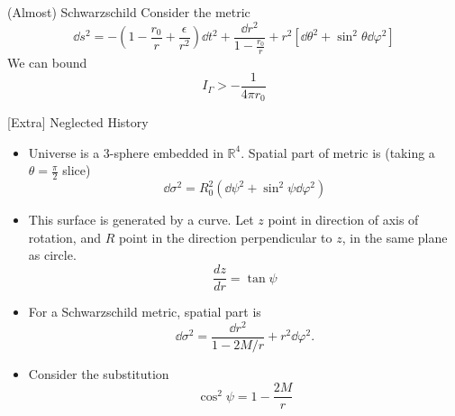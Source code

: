 \documentclass[aspectratio=169,xcolor=dvipsnames]{beamer}
\begin{document}
\begin{frame}{(Almost) Schwarzschild}
    Consider the metric 
    \begin{equation}
        \dd{s}^2 = -\left(1-\frac{r_0}{r} + \frac{\epsilon}{r^2}\right)\dd{t}^2 + \frac{\dd{r}^2}{1-\frac{r_0}{r}} + r^2\left[\dd{\theta}^2 + \sin^2\theta \dd{\varphi}^2\right]
    \end{equation}
    We can bound 
    \begin{equation}
        I_{\Gamma} > -\frac{1}{4\pi r_0}
    \end{equation}
\end{frame}
\begin{frame}{[Extra] Neglected History}
    \begin{itemize}
        \item Universe is a 3-sphere embedded in $\mathbb{R}^4.$ Spatial part of metric is (taking a $\theta=\frac{\pi}{2}$ slice)
        \begin{equation}
            \dd{\sigma}^2 = R_0^2\left(\dd{\psi}^2 + \sin^2\psi\dd{\varphi}^2\right)
        \end{equation}
        \item This surface is generated by a curve. Let $z$ point in direction of axis of rotation, and $R$ point in the direction perpendicular to $z$, in the same plane as circle.
        \begin{equation}
            \frac{dz}{dr} = \tan\psi
        \end{equation}
        \item For a Schwarzschild metric, spatial part is 
        \begin{equation}
            \dd{\sigma}^2 = \frac{\dd{r}^2}{1-2M/r} + r^2\dd{\varphi}^2.
        \end{equation}
        \item Consider the substitution 
        \begin{equation}
            \cos^2\psi = 1 - \frac{2M}{r}
        \end{equation}
    \end{itemize}
\end{frame}
\end{document}
